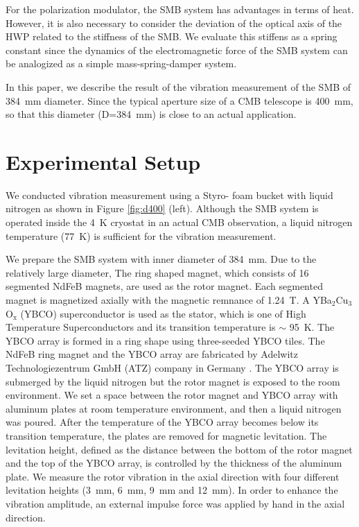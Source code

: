 \documentclass[a4paper]{jpconf}
\begin{document}
For the polarization modulator, the SMB system has advantages in terms of heat.
However, it is also necessary to consider the deviation of the optical axis of the HWP related to the stiffness of the SMB.
We evaluate this stiffens as a spring constant since the dynamics of the electromagnetic force of the SMB system can be analogized as a simple mass-spring-damper system.

In this paper, we describe the result of the vibration measurement of the SMB of 384~mm diameter.
Since the typical aperture size of a CMB telescope is 400~mm, so that this diameter (D=384~mm) is close to an actual application.

\section*{Experimental Setup}


We conducted vibration measurement using a Styro- foam bucket with liquid nitrogen as shown in Figure \ref{fig:d400} (left).
Although the SMB system is operated inside the 4~K cryostat in an actual CMB observation, a liquid nitrogen temperature (77~K) is sufficient for the vibration measurement.

We prepare the SMB system with inner diameter of 384~mm.
Due to the relatively large diameter, The ring shaped magnet, which consists of 16 segmented NdFeB magnets, are used as the rotor magnet.
Each segmented magnet is magnetized axially with the magnetic remnance of 1.24~T.
A YBa$_{2}$Cu$_{3}$O$_{\mathrm{x}}$ (YBCO) superconductor is used as the stator, which is one of High Temperature Superconductors and its transition temperature is $\sim$ 95~K.
The YBCO array is formed in a ring shape using three-seeded YBCO tiles.
The NdFeB ring magnet and the YBCO array are fabricated by Adelwitz Technologiezentrum GmbH (ATZ) company in Germany \cite{ATZ}.
The YBCO array is submerged by the liquid nitrogen but the rotor magnet is exposed to the room environment.
We set a space between the rotor magnet and YBCO array with aluminum plates at room temperature environment, and then a liquid nitrogen was poured.
After the temperature of the YBCO array becomes below its transition temperature, the plates are removed for magnetic levitation.
The levitation height, defined as the distance between the bottom of the rotor magnet and the top of the YBCO array, is controlled by the thickness of the aluminum plate.
We measure the rotor vibration in the axial direction with four different levitation heights (3~mm, 6~mm, 9~mm and 12~mm).
In order to enhance the vibration amplitude, an external impulse force was applied by hand in the axial direction.
\end{document}
